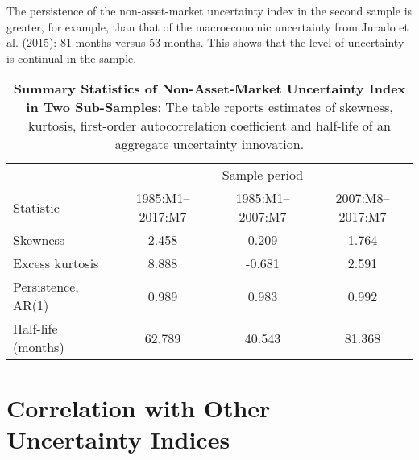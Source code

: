 \documentclass[12pt,twoside]{reedthesis}
\begin{document}
The persistence of the non-asset-market uncertainty index in the second sample is greater, for example, than that of the macroeconomic uncertainty from Jurado et al. (\protect\hyperlink{ref-juraludvng:2015}{2015}): 81 months versus 53 months. This shows that the level of uncertainty is continual in the sample.


\begin{table}[t]

\caption[Summary Statistics of Non-Asset-Market Uncertainty Index in Two Sub-Samples]{\label{tab:summary-table}\textbf{Summary Statistics of Non-Asset-Market Uncertainty Index in Two Sub-Samples}: The table reports estimates of skewness, kurtosis, first-order autocorrelation coefficient and half-life of an aggregate uncertainty innovation.}
\centering
\begin{tabular}{lccc}
\toprule
\multicolumn{1}{c}{} & \multicolumn{3}{c}{Sample period} \\
\cmidrule(l{3pt}r{3pt}){2-4}
Statistic & 1985:M1--2017:M7 & 1985:M1--2007:M7 & 2007:M8--2017:M7\\
\midrule
Skewness & 2.458 & 0.209 & 1.764\\
Excess kurtosis & 8.888 & -0.681 & 2.591\\
Persistence, AR(1) & 0.989 & 0.983 & 0.992\\
Half-life (months) & 62.789 & 40.543 & 81.368\\
\bottomrule
\end{tabular}
\end{table}
\hypertarget{correlation-with-uncertainty-indices}{%
\section{Correlation with Other Uncertainty Indices}\label{correlation-with-uncertainty-indices}}
\end{document}
